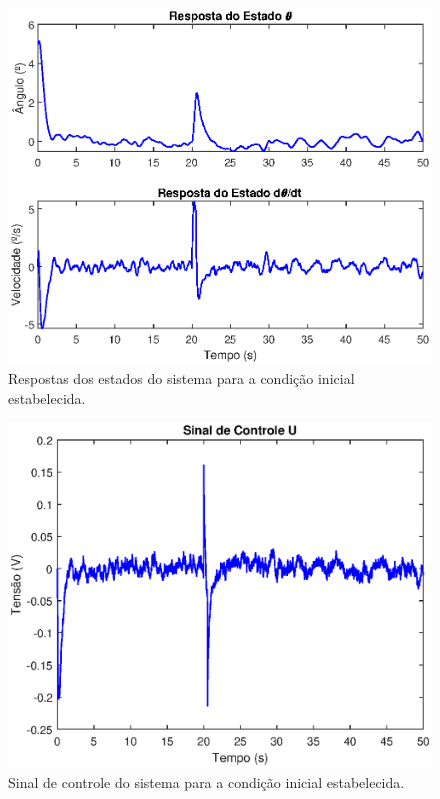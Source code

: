 \begin{figure}[H]
    \centering
    \includegraphics[scale=0.75]{ProjControladores/lqg_real_estados.eps}
    \caption{Respostas dos estados do sistema para a condição inicial estabelecida.}
    \label{fig:RespostaEstados-LQG-real}
\end{figure}{}

\begin{figure}[H]
    \centering
    \includegraphics[scale=0.75]{ProjControladores/lqg_real_sinal_controle.eps}
    \caption{Sinal de controle do sistema para a condição inicial estabelecida.}
    \label{fig:SinalControle-LQG-real}
\end{figure}{}



